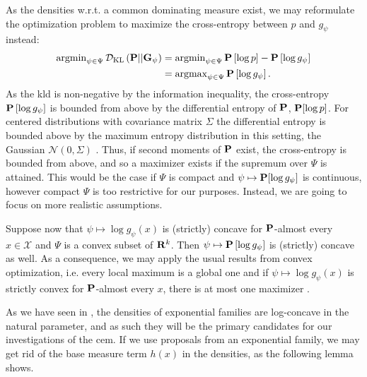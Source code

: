 As the densities w.r.t. a common dominating measure exist, we may reformulate the optimization problem to maximize the cross-entropy between $p$ and $g_{\psi}$ instead:
\begin{align}
    \begin{split}
    \argmin_{\psi \in \Psi} \Dkl{\P}{\G_{\psi}} &=  \argmin_{\psi \in \Psi} \P \left[\log p \right] - \P \left[\log g_{\psi}\right] \\
    &= \argmax_{\psi \in \Psi} \P \left[\log g_{\psi}\right].
    \end{split} \label{eq:ce_argmax}
\end{align}
As the \gls{kld} is non-negative by the information inequality, the cross-entropy $\P \left[ \log g_{\psi} \right]$ is bounded from above by the differential entropy of $\P$, $\P [\log p]$. For centered distributions with covariance matrix $\Sigma$ the differential entropy is bounded above by the maximum entropy distribution in this setting, the Gaussian $\mathcal N(0, \Sigma)$ \citep[Example 12.2.8]{Cover2006Elements}. Thus, if second moments of $\P$ exist, the cross-entropy is bounded from above, and so a maximizer exists if the supremum over $\Psi$ is attained. This would be the case if $\Psi$ is compact and $\psi \mapsto \P [\log g_{\psi}]$ is continuous, however compact $\Psi$ is too restrictive for our purposes. Instead, we are going to focus on more realistic assumptions.

Suppose now that $\psi \mapsto \log g_{\psi}(x)$ is (strictly) concave for $\P$-almost every $x \in \mathcal X$ and $\Psi$ is a convex subset of $\R^{k}$. Then $\psi \mapsto \P \left[\log g_{\psi}\right]$ is (strictly) concave as well. As a consequence, we may apply the usual results from convex optimization, i.e. every local maximum is a global one and if $\psi \mapsto \log g_{\psi}(x)$ is strictly convex for $\P$-almost every $x$, there is at most one maximizer \citep[Theorem 3.4.2]{Bazaraa2006Nonlinear}.

As we have seen in , the densities of exponential families are log-concave in the natural parameter, and as such they will be the primary candidates for our investigations of the \gls{cem}. 
If we use proposals from an exponential family, we may get rid of the base measure term $h(x)$ in the densities, as the following lemma shows.

